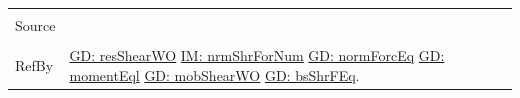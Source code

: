 \documentclass[12pt]{article}
\begin{document}
\begin{minipage}{\textwidth}
\begin{tabular}{p{} p{}}
                                                          \\ \midrule \\
                                                          Source & \cite{fredlund1977}
                                                                   \\ \midrule \\
                                                                   RefBy & \hyperref[GD:resShearWO]{GD: resShearWO} \hyperref[IM:nrmShrForNum]{IM: nrmShrForNum} \hyperref[GD:normForcEq]{GD: normForcEq} \hyperref[GD:momentEql]{GD: momentEql} \hyperref[GD:mobShearWO]{GD: mobShearWO} \hyperref[GD:bsShrFEq]{GD: bsShrFEq}.
\\ \bottomrule \end{tabular}
\end{minipage}
\par~
\end{document}
